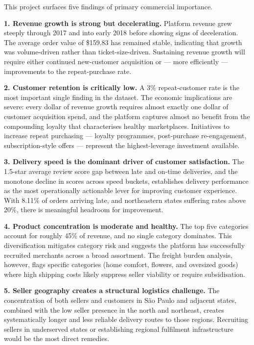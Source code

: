 \documentclass[12pt,a4paper]{article}
\begin{document}
This project surfaces five findings of primary commercial importance.

\textbf{1. Revenue growth is strong but decelerating.} Platform revenue grew steeply
through 2017 and into early 2018 before showing signs of deceleration. The average order
value of \$159.83 has remained stable, indicating that growth was volume-driven rather
than ticket-size-driven. Sustaining revenue growth will require either continued new-customer
acquisition or — more efficiently — improvements to the repeat-purchase rate.

\textbf{2. Customer retention is critically low.} A 3\% repeat-customer rate is the
most important single finding in the dataset. The economic implications are severe:
every dollar of revenue growth requires almost exactly one dollar of customer acquisition
spend, and the platform captures almost no benefit from the compounding loyalty that
characterises healthy marketplaces. Initiatives to increase repeat purchasing — loyalty
programmes, post-purchase re-engagement, subscription-style offers — represent the
highest-leverage investment available.

\textbf{3. Delivery speed is the dominant driver of customer satisfaction.} The 1.5-star
average review score gap between late and on-time deliveries, and the monotone decline in
scores across speed buckets, establishes delivery performance as the most operationally
actionable lever for improving customer experience. With 8.11\% of orders arriving late,
and northeastern states suffering rates above 20\%, there is meaningful headroom for
improvement.

\textbf{4. Product concentration is moderate and healthy.} The top five categories
account for roughly 45\% of revenue, and no single category dominates. This diversification
mitigates category risk and suggests the platform has successfully recruited merchants across
a broad assortment. The freight burden analysis, however, flags specific categories
(home comfort, flowers, and oversized goods) where high shipping costs likely suppress
seller viability or require subsidisation.

\textbf{5. Seller geography creates a structural logistics challenge.} The concentration
of both sellers and customers in São Paulo and adjacent states, combined with the low seller
presence in the north and northeast, creates systematically longer and less reliable delivery
routes to those regions. Recruiting sellers in underserved states or establishing
regional fulfilment infrastructure would be the most direct remedies.
\end{document}

